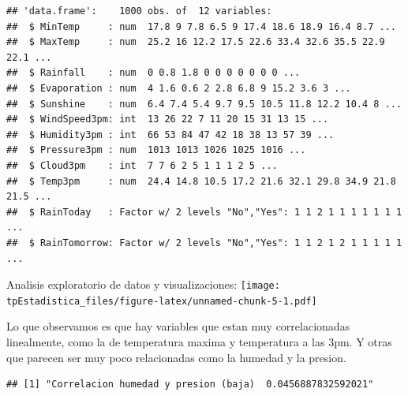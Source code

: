 \documentclass[
]{article}
\newenvironment{Shaded}{\begin{snugshade}}{\end{snugshade}}
\newcommand{\FunctionTok}[1]{\textcolor[rgb]{0.00,0.00,0.00}{#1}}
\newcommand{\NormalTok}[1]{#1}
\newcommand{\SpecialCharTok}[1]{\textcolor[rgb]{0.00,0.00,0.00}{#1}}
\newcommand{\StringTok}[1]{\textcolor[rgb]{0.31,0.60,0.02}{#1}}
\begin{document}
\begin{verbatim}
## 'data.frame':    1000 obs. of  12 variables:
##  $ MinTemp     : num  17.8 9 7.8 6.5 9 17.4 18.6 18.9 16.4 8.7 ...
##  $ MaxTemp     : num  25.2 16 12.2 17.5 22.6 33.4 32.6 35.5 22.9 22.1 ...
##  $ Rainfall    : num  0 0.8 1.8 0 0 0 0 0 0 0 ...
##  $ Evaporation : num  4 1.6 0.6 2 2.8 6.8 9 15.2 3.6 3 ...
##  $ Sunshine    : num  6.4 7.4 5.4 9.7 9.5 10.5 11.8 12.2 10.4 8 ...
##  $ WindSpeed3pm: int  13 26 22 7 11 20 15 31 13 15 ...
##  $ Humidity3pm : int  66 53 84 47 42 18 38 13 57 39 ...
##  $ Pressure3pm : num  1013 1013 1026 1025 1016 ...
##  $ Cloud3pm    : int  7 7 6 2 5 1 1 1 2 5 ...
##  $ Temp3pm     : num  24.4 14.8 10.5 17.2 21.6 32.1 29.8 34.9 21.8 21.5 ...
##  $ RainToday   : Factor w/ 2 levels "No","Yes": 1 1 2 1 1 1 1 1 1 1 ...
##  $ RainTomorrow: Factor w/ 2 levels "No","Yes": 1 1 2 1 2 1 1 1 1 1 ...
\end{verbatim}

Analisis exploratorio de datos y visualizaciones:
\texttt{[image: tpEstadistica\_files/figure-latex/unnamed-chunk-5-1.pdf]}

Lo que observamos es que hay variables que estan muy correlacionadas
linealmente, como la de temperatura maxima y temperatura a las 3pm. Y
otras que parecen ser muy poco relacionadas como la humedad y la
presion.

\begin{Shaded}
\end{Shaded}

\begin{verbatim}
## [1] "Correlacion humedad y presion (baja)  0.0456887832592021"
\end{verbatim}

\begin{Shaded}
\end{Shaded}
\end{document}
